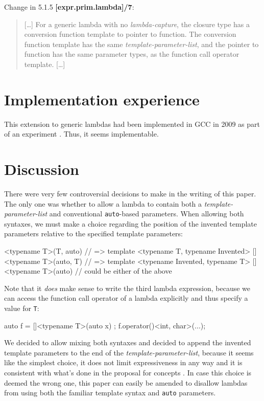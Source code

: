 \documentclass[11pt]{article}
\newcommand{\cc}[1]{\texttt{#1}}
\newcommand{\deleted}[1]{\sethlcolor{red}{\hl{#1}}}
\begin{document}
Change in 5.1.5 \textbf{[expr.prim.lambda]/7}:

\begin{quote}
  [\dots] For a generic lambda with no \textit{lambda-capture}, the closure type
  has a conversion function template to pointer to function. The conversion function
  template has the same \deleted{invented} \textit{template-parameter-list},
  and the pointer to function has the same parameter types, as the function
  call operator template. [\dots]
\end{quote}


\section{Implementation experience}
This extension to generic lambdas had been implemented in GCC in 2009 as part
of an experiment \cite{GCC}. Thus, it seems implementable.


\section{Discussion} \label{discussion}
There were very few controversial decisions to make in the writing of this
paper. The only one was whether to allow a lambda to contain both a
\textit{template-parameter-list} and conventional \cc{auto}-based parameters.
When allowing both syntaxes, we must make a choice regarding the position of
the invented template parameters relative to the specified template parameters:

\begin{cpp}
[]<typename T>(T, auto) // => template <typename T, typename Invented>
[]<typename T>(auto, T) // => template <typename Invented, typename T>
[]<typename T>(auto)    // could be either of the above
\end{cpp}

Note that it \textit{does} make sense to write the third lambda expression,
because we can access the function call operator of a lambda explicitly and
thus specify a value for \cc T:

\begin{cpp}
auto f = []<typename T>(auto x) { };
f.operator()<int, char>(...);
\end{cpp}

We decided to allow mixing both syntaxes and decided to append the invented
template parameters to the end of the \textit{template-parameter-list}, because
it seems like the simplest choice, it does not limit expressiveness in any way
and it is consistent with what's done in the proposal for concepts \cite{N4553}.
In case this choice is deemed the wrong one, this paper can easily be amended
to disallow lambdas from using both the familiar template syntax and \cc{auto}
parameters.
\end{document}
